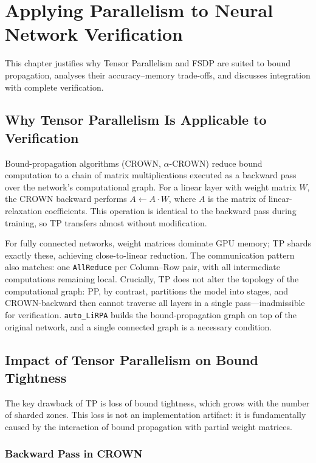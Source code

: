 \section{Applying Parallelism to Neural Network Verification}
\label{sec:parallel-verifiers}

This chapter justifies why Tensor Parallelism and FSDP are suited to bound
propagation, analyses their accuracy--memory trade-offs, and discusses
integration with complete verification.

\subsection{Why Tensor Parallelism Is Applicable to Verification}

Bound-propagation algorithms (CROWN, $\alpha$-CROWN) reduce bound computation
to a chain of matrix multiplications executed as a backward pass over the
network's computational graph. For a linear layer with weight matrix $W$, the
CROWN backward performs $A \leftarrow A \cdot W$, where $A$ is the matrix of
linear-relaxation coefficients. This operation is identical to the backward
pass during training, so TP transfers almost without modification.

For fully connected networks, weight matrices dominate GPU memory; TP shards
exactly these, achieving close-to-linear reduction. The communication pattern
also matches: one \texttt{AllReduce} per Column--Row pair, with all intermediate
computations remaining local. Crucially, TP does not alter the topology of the
computational graph: PP, by contrast, partitions the model into stages, and
CROWN-backward then cannot traverse all layers in a single pass---inadmissible
for verification. \texttt{auto\_LiRPA} builds the bound-propagation graph on
top of the original network, and a single connected graph is a necessary
condition.

\subsection{Impact of Tensor Parallelism on Bound Tightness}
\label{sec:tp-precision-loss}

The key drawback of TP is loss of bound tightness, which grows with the number
of sharded zones. This loss is not an implementation artifact: it is
fundamentally caused by the interaction of bound propagation with partial weight
matrices.

\subsubsection{Backward Pass in CROWN}

